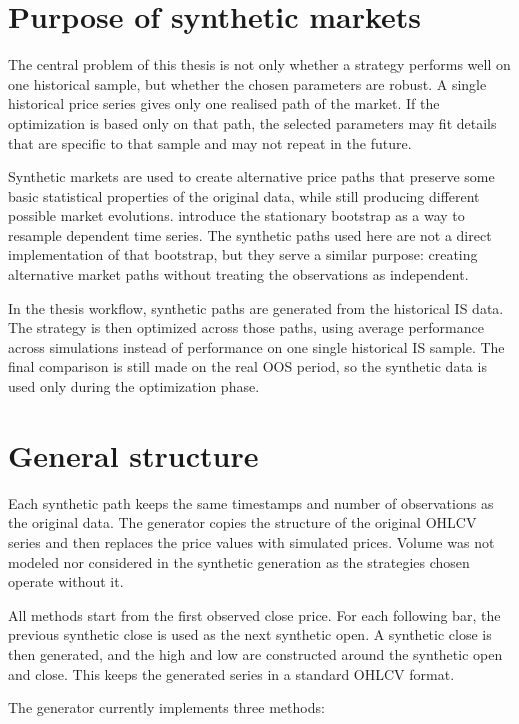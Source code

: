 \section{Purpose of synthetic markets}

The central problem of this thesis is not only whether a strategy performs well on one historical
sample, but whether the chosen parameters are robust. A single historical price series gives only
one realised path of the market. If the optimization is based only on that path, the selected
parameters may fit details that are specific to that sample and may not repeat in the future.

Synthetic markets are used to create alternative price paths that preserve some basic statistical
properties of the original data, while still producing different possible market evolutions.
\citet{politis1994} introduce the stationary bootstrap as a way to resample dependent time
series. The synthetic paths used here are not a direct implementation of that bootstrap, but they
serve a similar purpose: creating alternative market paths without treating the observations as
independent.

In the thesis workflow, synthetic paths are generated from the historical IS data. The strategy is
then optimized across those paths, using average performance across simulations instead of
performance on one single historical IS sample. The final comparison is still made on the real OOS
period, so the synthetic data is used only during the optimization phase.

\section{General structure}

Each synthetic path keeps the same timestamps and number of observations as the original data. The
generator copies the structure of the original OHLCV series and then replaces the price values with
simulated prices. Volume was not modeled nor considered in the synthetic generation as the
strategies chosen operate without it.

All methods start from the first observed close price. For each following bar, the previous
synthetic close is used as the next synthetic open. A synthetic close is then generated, and the
high and low are constructed around the synthetic open and close. This keeps the generated series in
a standard OHLCV format.

The generator currently implements three methods:

